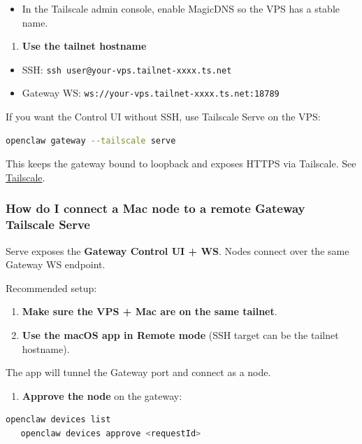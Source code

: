 \begin{itemize}
  \item In the Tailscale admin console, enable MagicDNS so the VPS has a stable name.
\end{itemize}

\begin{enumerate}
  \item \textbf{Use the tailnet hostname}
\end{enumerate}

\begin{itemize}
  \item SSH: \texttt{ssh user@your-vps.tailnet-xxxx.ts.net}
  \item Gateway WS: \texttt{ws://your-vps.tailnet-xxxx.ts.net:18789}
\end{itemize}


If you want the Control UI without SSH, use Tailscale Serve on the VPS:

\begin{lstlisting}[language=bash]
openclaw gateway --tailscale serve
\end{lstlisting}


This keeps the gateway bound to loopback and exposes HTTPS via Tailscale. See \href{/gateway/tailscale}{Tailscale}.

\subsubsection{How do I connect a Mac node to a remote Gateway Tailscale Serve}


Serve exposes the \textbf{Gateway Control UI + WS}. Nodes connect over the same Gateway WS endpoint.

Recommended setup:

\begin{enumerate}
  \item \textbf{Make sure the VPS + Mac are on the same tailnet}.
  \item \textbf{Use the macOS app in Remote mode} (SSH target can be the tailnet hostname).
\end{enumerate}

The app will tunnel the Gateway port and connect as a node.
\begin{enumerate}
  \item \textbf{Approve the node} on the gateway:
\end{enumerate}


\begin{lstlisting}[language=bash]
   openclaw devices list
   openclaw devices approve <requestId>
\end{lstlisting}


